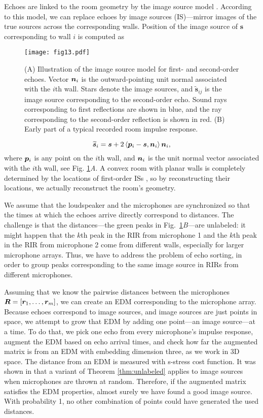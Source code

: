 \documentclass[10pt,double]{IEEEtran}
\providecommand{\inprod}[1]{\left\langle#1\right\rangle}
\renewcommand{\vec}[1]{\ensuremath{\boldsymbol{#1}}}
\providecommand{\wt}[1]{\ensuremath{\widetilde{#1}}}
\providecommand{\vs}{\vec{s}}
\begin{document}
Echoes are linked to the room geometry by the image source model
\cite{Allen:1979ua}. According to this model, we can replace echoes by image
sources (IS)---mirror images of the true sources across the corresponding walls.
Position of the image source of $\vs$ corresponding to wall $i$ is computed as

\begin{figure}[t]
\centering
\texttt{[image: fig13.pdf]}
\caption{(A) Illustration of the image source model for first- and second-order
echoes. Vector $\vn_i$ is the outward-pointing unit normal associated with the
$i$th wall. Stars denote the image sources, and $\wt{\vs}_{ij}$ is the image
source corresponding to the second-order echo. Sound rays corresponding to
first reflections are shown in blue, and the ray corresponding to the
second-order reflection is shown in red. (B) Early part of a typical recorded
room impulse response.}
\label{fig:room_hearing_is}
\end{figure}

\begin{equation}
\label{eq:image-sources}
\wt{\vs}_i = \vs + 2 \inprod{\vp_i - \vs, \vn_i} \vn_i,
\end{equation}
where $\vp_i$ is any point on the $i$th wall, and $\vn_i$ is the unit normal
vector associated with the $i$th wall, see Fig.
\ref{fig:room_hearing_is}\textsl{A}.
A convex room with planar walls is completely determined by the locations of
first-order ISs \cite{Dokmanic:2013dz}, so by reconstructing their locations,
we actually reconstruct the room's geometry.

We assume that the loudspeaker and the microphones are synchronized so that
the times at which the echoes arrive directly correspond to distances. The
challenge is that the distances---the green peaks in
Fig.~\ref{fig:room_hearing_is}\textsl{B}---are unlabeled: it might happen that
the $k$th peak in the RIR from microphone 1 and the $k$th peak in the RIR from
microphone 2 come from different walls, especially for larger microphone
arrays. Thus, we have to address the problem of echo sorting, in order to
group peaks corresponding to the same image source in RIRs from different
microphones.

Assuming that we know the pairwise distances between the microphones $\mR =
[\vr_1, \ldots, \vr_m]$, we can create an EDM corresponding to the microphone
array. Because echoes correspond to image sources, and image sources are just
points in space, we attempt to grow that EDM by adding one point---an image
source---at a time. To do that, we pick one echo from every microphone's
impulse response, augment the EDM based on echo arrival times, and check how
far the augmented matrix is from an EDM with embedding dimension three, as we
work in 3D space. The distance from an EDM is measured with s-stress cost
function. It was shown in \cite{Dokmanic:2013dz} that a variant of Theorem
\ref{thm:unlabeled} applies to image sources when microphones are thrown at
random. Therefore, if the augmented matrix satisfies the EDM properties,
almost surely we have found a good image source. With probability 1, no
other combination of points could have generated the used distances.
\end{document}
